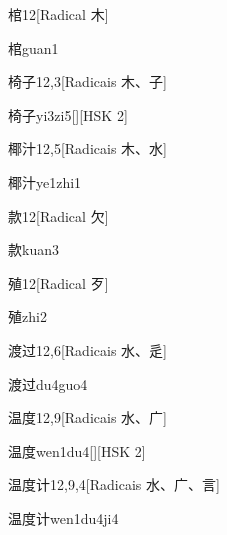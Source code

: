 \begin{entry}{棺}{12}[Radical ⽊]
  \begin{phonetics}{棺}{guan1}
  \end{phonetics}
\end{entry}

\begin{entry}{椅子}{12,3}[Radicais ⽊、⼦]
  \begin{phonetics}{椅子}{yi3zi5}[][HSK 2]
  \end{phonetics}
\end{entry}

\begin{entry}{椰汁}{12,5}[Radicais ⽊、⽔]
  \begin{phonetics}{椰汁}{ye1zhi1}
  \end{phonetics}
\end{entry}

\begin{entry}{款}{12}[Radical ⽋]
  \begin{phonetics}{款}{kuan3}
  \end{phonetics}
\end{entry}

\begin{entry}{殖}{12}[Radical ⽍]
  \begin{phonetics}{殖}{zhi2}
  \end{phonetics}
\end{entry}

\begin{entry}{渡过}{12,6}[Radicais ⽔、⾡]
  \begin{phonetics}{渡过}{du4guo4}
  \end{phonetics}
\end{entry}

\begin{entry}{温度}{12,9}[Radicais ⽔、⼴]
  \begin{phonetics}{温度}{wen1du4}[][HSK 2]
  \end{phonetics}
\end{entry}

\begin{entry}{温度计}{12,9,4}[Radicais ⽔、⼴、⾔]
  \begin{phonetics}{温度计}{wen1du4ji4}
  \end{phonetics}
\end{entry}

